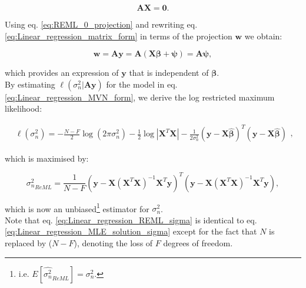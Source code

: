 \begin{equation}\label{eq:REML_0_projection}
    \mathbf{A}\mathbf{X} = \mathbf{0}.
\end{equation}

Using eq. \eqref{eq:REML_0_projection} and rewriting eq. \eqref{eq:Linear_regression_matrix_form} in terms of the projection $\mathbf{w}$ we obtain:

\begin{equation}\label{eq:REML_w_projection}
    \mathbf{w} = \mathbf{A}\mathbf{y} = \mathbf{A}(\mathbf{X}\boldsymbol{\beta} + \boldsymbol{\psi}) = \mathbf{A}\boldsymbol{\psi},
\end{equation}

which provides an expression of $\mathbf{y}$ that is independent of $\boldsymbol{\beta}$.\\

By estimating $\ell(\sigma_n^2 | \mathbf{A}\mathbf{y})$ for the model in eq. \eqref{eq:Linear_regression_MVN_form}, we derive the log restricted maximum likelihood:

\begin{equation} \label{eq:Linear_regression_log_restricted_likelihood}
\begin{split}
\ell(\sigma_n^2) = -\frac{N-F}{2}\log (2\pi\sigma_n^2) - \frac{1}{2}\log |\mathbf{X}^T\mathbf{X}| 
- \frac{1}{2\sigma_n^2}(\mathbf{y}-\mathbf{X}\hat{\boldsymbol{\beta}})^T(\mathbf{y}-\mathbf{X}\hat{\boldsymbol{\beta}})  
\end{split},
\end{equation}

which is maximised by:

\begin{equation}\label{eq:Linear_regression_REML_sigma}
\hat{\sigma_n^2}_{ReML} =  \frac{1}{N-F}(\mathbf{y}-\mathbf{X}(\mathbf{X}^T\mathbf{X})^{-1}\mathbf{X}^T\mathbf{y})^T(\mathbf{y}-\mathbf{X}(\mathbf{X}^T\mathbf{X})^{-1}\mathbf{X}^T\mathbf{y}),
\end{equation}

which is now an unbiased\footnote{i.e. $E[\hat{\sigma_n^2}_{ReML}] = \sigma_n^2$.} estimator for $\sigma_n^2$. \\

Note that eq. \eqref{eq:Linear_regression_REML_sigma} is identical to eq. \eqref{eq:Linear_regression_MLE_solution_sigma} except for the fact that $N$ is replaced by ($N-F$), denoting the loss of $F$ degrees of freedom.

\newpage


